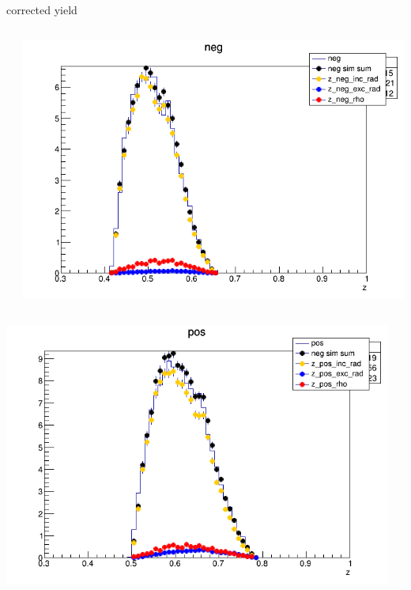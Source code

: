 \begin{frame}{corrected yield}
\begin{columns}
\begin{column}[T]{0.25\textwidth}
\end{column}
\begin{column}[T]{0.25\textwidth}
\includegraphics[width = \textwidth]{results/yield/statistics_corr/yield_x_Q2_z_0.50_5.000_0.50_neg.png}
\end{column}
\end{columns}
\begin{columns}
\begin{column}[T]{0.25\textwidth}
\includegraphics[width = \textwidth]{results/yield/statistics_corr/yield_x_Q2_z_0.50_5.000_0.60_pos.png}
\end{column}
\begin{column}[T]{0.25\textwidth}

\end{column}
\end{columns}
\end{frame}
